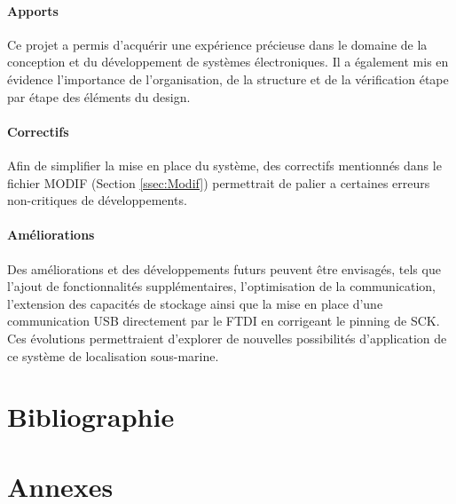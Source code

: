 \documentclass[12pt,a4paper,twoside]{article}
\begin{document}
{	\paragraph{Apports} Ce projet a permis d'acquérir une expérience précieuse dans le domaine de la conception et du développement de systèmes électroniques. Il a également mis en évidence l'importance de l'organisation, de la structure et de la vérification étape par étape des éléments du design.
	
	\paragraph{Correctifs} Afin de simplifier la mise en place du système, des correctifs mentionnés dans le fichier MODIF (Section \ref{ssec:Modif}) permettrait de palier a certaines erreurs non-critiques de développements.
	
	\paragraph{Améliorations} Des améliorations et des développements futurs peuvent être envisagés, tels que l'ajout de fonctionnalités supplémentaires, l'optimisation de la communication, l'extension des capacités de stockage ainsi que la mise en place d'une communication USB directement par le FTDI en corrigeant le pinning de SCK. Ces évolutions permettraient d'explorer de nouvelles possibilités d'application de ce système de localisation sous-marine.
}


\newpage
\nocite{*}
\section{Bibliographie}
 


\clearpage
\section{Annexes}








\end{document}

